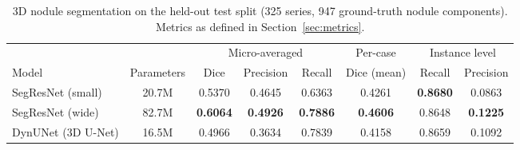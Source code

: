\begin{table}
\caption{3D nodule segmentation on the held-out test split (325 series, 947 ground-truth nodule components). Metrics as defined in Section~\ref{sec:metrics}.}
\label{tab:nodule3d}
\centering
\small
\setlength{\tabcolsep}{4pt}
\begin{tabular}{lccccccc}
\toprule
& & \multicolumn{3}{c}{Micro-averaged} & Per-case & \multicolumn{2}{c}{Instance level} \\
\cmidrule(lr){3-5} \cmidrule(lr){6-6} \cmidrule(lr){7-8}
Model & Parameters & Dice & Precision & Recall & Dice (mean) & Recall & Precision \\
\midrule
SegResNet (small) & 20.7M & 0.5370 & 0.4645 & 0.6363 & 0.4261 & \textbf{0.8680} & 0.0863 \\
SegResNet (wide)  & 82.7M & \textbf{0.6064} & \textbf{0.4926} & \textbf{0.7886} & \textbf{0.4606} & 0.8648 & \textbf{0.1225} \\
DynUNet (3D U-Net) & 16.5M & 0.4966 & 0.3634 & 0.7839 & 0.4158 & 0.8659 & 0.1092 \\
\bottomrule
\end{tabular}
\end{table}
